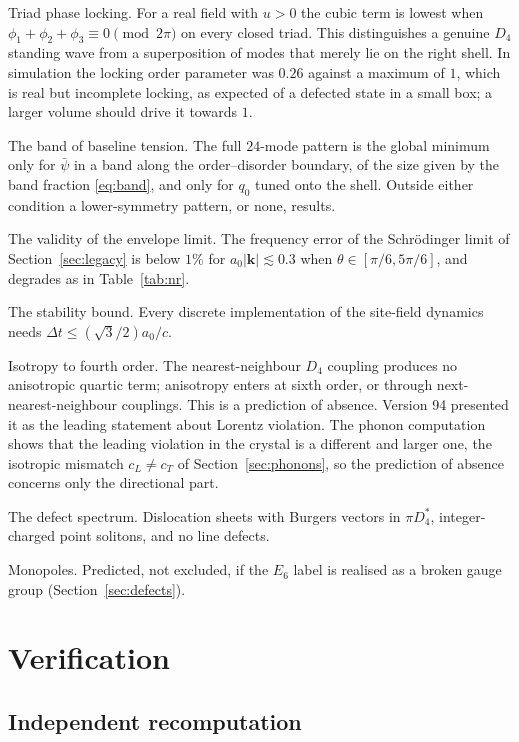 \documentclass[a4paper,11pt]{article}
\numberwithin{equation}{section}
\theoremstyle{jsplain}
\theoremstyle{jsrem}
\begin{document}
Triad phase locking. For a real field with $u>0$ the cubic term is lowest when $\phi_1+\phi_2+\phi_3\equiv0\pmod{2\pi}$ on every closed triad. This distinguishes a genuine $D_4$ standing wave from a superposition of modes that merely lie on the right shell. In simulation the locking order parameter was $0.26$ against a maximum of $1$, which is real but incomplete locking, as expected of a defected state in a small box; a larger volume should drive it towards $1$.

The band of baseline tension. The full $24$-mode pattern is the global minimum only for $\bar\psi$ in a band along the order--disorder boundary, of the size given by the band fraction \eqref{eq:band}, and only for $q_0$ tuned onto the shell. Outside either condition a lower-symmetry pattern, or none, results.

The validity of the envelope limit. The frequency error of the Schrödinger limit of Section~\ref{sec:legacy} is below $1\%$ for $a_0|\mathbf{k}|\lesssim0.3$ when $\theta\in[\pi/6,5\pi/6]$, and degrades as in Table~\ref{tab:nr}.

The stability bound. Every discrete implementation of the site-field dynamics needs $\Delta t\le(\sqrt3/2)a_0/c$.

Isotropy to fourth order. The nearest-neighbour $D_4$ coupling produces no anisotropic quartic term; anisotropy enters at sixth order, or through next-nearest-neighbour couplings. This is a prediction of absence. Version 94 presented it as the leading statement about Lorentz violation. The phonon computation shows that the leading violation in the crystal is a different and larger one, the isotropic mismatch $c_L\ne c_T$ of Section~\ref{sec:phonons}, so the prediction of absence concerns only the directional part.

The defect spectrum. Dislocation sheets with Burgers vectors in $\pi D_4^*$, integer-charged point solitons, and no line defects.

Monopoles. Predicted, not excluded, if the $E_6$ label is realised as a broken gauge group (Section~\ref{sec:defects}).

\section{Verification}\label{sec:verification}

\subsection{Independent recomputation}
\end{document}
